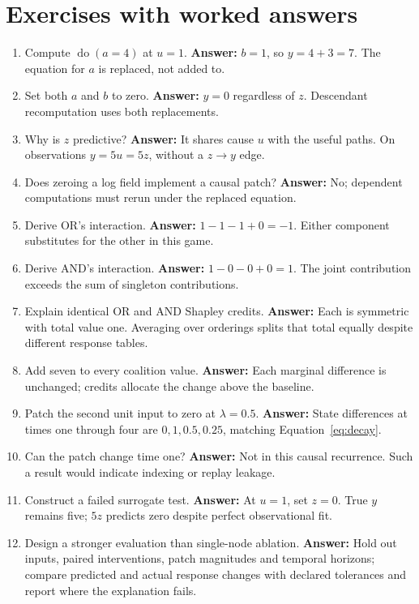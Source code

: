 \section{Exercises with worked answers}
\begin{enumerate}
\item Compute $\operatorname{do}(a=4)$ at $u=1$. \textbf{Answer:}
$b=1$, so $y=4+3=7$. The equation for $a$ is replaced, not added to.
\item Set both $a$ and $b$ to zero. \textbf{Answer:} $y=0$ regardless
of $z$. Descendant recomputation uses both replacements.
\item Why is $z$ predictive? \textbf{Answer:} It shares cause $u$ with
the useful paths. On observations $y=5u=5z$, without a $z\to y$ edge.
\item Does zeroing a log field implement a causal patch? \textbf{Answer:}
No; dependent computations must rerun under the replaced equation.
\item Derive OR's interaction. \textbf{Answer:} $1-1-1+0=-1$.
Either component substitutes for the other in this game.
\item Derive AND's interaction. \textbf{Answer:} $1-0-0+0=1$.
The joint contribution exceeds the sum of singleton contributions.
\item Explain identical OR and AND Shapley credits. \textbf{Answer:}
Each is symmetric with total value one. Averaging over orderings splits
that total equally despite different response tables.
\item Add seven to every coalition value. \textbf{Answer:} Each marginal
difference is unchanged; credits allocate the change above the baseline.
\item Patch the second unit input to zero at $\lambda=0.5$.
\textbf{Answer:} State differences at times one through four are
$0,1,0.5,0.25$, matching Equation~\ref{eq:decay}.
\item Can the patch change time one? \textbf{Answer:} Not in this causal
recurrence. Such a result would indicate indexing or replay leakage.
\item Construct a failed surrogate test. \textbf{Answer:} At $u=1$,
set $z=0$. True $y$ remains five; $5z$ predicts zero despite perfect
observational fit.
\item Design a stronger evaluation than single-node ablation.
\textbf{Answer:} Hold out inputs, paired interventions, patch magnitudes
and temporal horizons; compare predicted and actual response changes with
declared tolerances and report where the explanation fails.
\end{enumerate}

